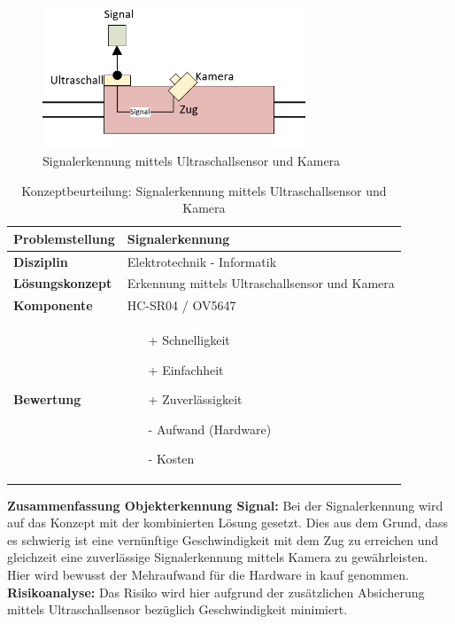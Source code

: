 \documentclass[../../main.tex]{subfiles}
\begin{document}
    \begin{figure}[H]
        \centering
        \includegraphics[width=0.7\textwidth]{signal_kombi.png}
        \caption{Signalerkennung mittels Ultraschallsensor und Kamera}
    \end{figure}

    \vspace{1cm}
    \begin{flushleft}
        \begin{table}[H]
        \begin{tabular}{ | l | p{11cm} |}
        \hline
        \textbf{Problemstellung} & Signalerkennung \\ \hline
        \textbf{Disziplin} & Elektrotechnik - Informatik \\ \hline
        \textbf{Lösungskonzept} & Erkennung mittels Ultraschallsensor und Kamera \\ \hline
        \textbf{Komponente} & HC-SR04 / OV5647 \\ \hline
        \textbf{Bewertung} &  \begin{itemize}
                                \item[+] Schnelligkeit
                                \item[+] Einfachheit
                                \item[+] Zuverlässigkeit
                                \item[-] Aufwand (Hardware)   
                                \item[-] Kosten 
                              \end{itemize} \\ \hline
        \end{tabular}
        \caption{Konzeptbeurteilung: Signalerkennung mittels Ultraschallsensor und Kamera}
        \label{tab:konzept_wurfel_Stereokamera}
    \end{table}
    \end{flushleft}

    \textbf{Zusammenfassung Objekterkennung Signal:}
    Bei der Signalerkennung wird auf das Konzept mit der kombinierten Lösung gesetzt. Dies aus dem Grund, dass es schwierig ist eine vernünftige Geschwindigkeit mit dem Zug zu erreichen und gleichzeit eine zuverlässige Signalerkennung mittels Kamera zu gewährleisten. Hier wird bewusst der Mehraufwand für die Hardware in kauf genommen.
    \textbf{Risikoanalyse:}
    Das Risiko wird hier aufgrund der zusätzlichen Absicherung mittels Ultraschallsensor bezüglich Geschwindigkeit minimiert.
\end{document}

